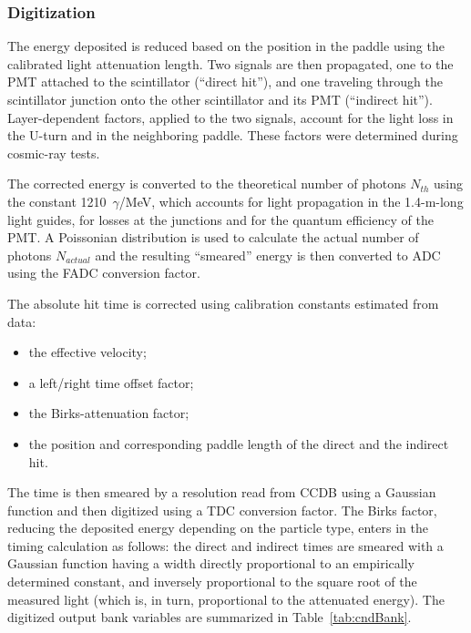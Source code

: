 \subsubsection{Digitization}

The energy deposited is reduced based on the position in the paddle using the calibrated light attenuation length.
Two signals are then propagated, one to the PMT attached to the scintillator (``direct hit''), and one traveling
through the scintillator junction onto the other scintillator and its PMT (``indirect hit''). Layer-dependent factors,
applied to the two  signals, account for the light loss in the U-turn and in the neighboring paddle. These factors were
determined during cosmic-ray tests.

The corrected energy is converted to the theoretical number of photons $N_{th}$ using the constant 1210~$\gamma$/MeV,
which accounts for light propagation in the 1.4-m-long light guides, for losses at the junctions and for the quantum
efficiency of the PMT. A Poissonian distribution is used to calculate the actual number of photons $N_{actual}$ and the
resulting ``smeared'' energy is then converted to ADC using the FADC conversion factor.

The absolute hit time is corrected using calibration constants estimated from data:

\begin{itemize}
	\item the effective velocity;
	\item a left/right time offset factor;
	\item the Birks-attenuation factor;
	\item the position and corresponding paddle length of the direct and the indirect hit.
\end{itemize}

The time is then smeared by a resolution read from CCDB using a Gaussian function and then digitized using a TDC
conversion factor. The Birks factor, reducing the deposited energy depending on the particle type, enters in the timing
calculation as follows: the direct and indirect times are smeared with a Gaussian function having a width directly
proportional to an empirically determined constant, and inversely proportional to the square root of the measured
light (which is, in turn, proportional to the attenuated energy). The digitized output bank variables are summarized in
Table~\ref{tab:cndBank}.

